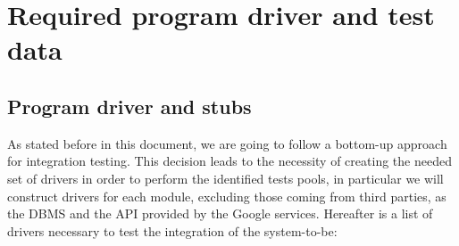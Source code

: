 \documentclass[10pt, a4paper,titlepage]{article}
\begin{document}
\section{Required program driver and test data}
\subsection{Program driver and stubs}
As stated before in this document, we are going to follow a bottom-up approach for integration testing. This decision leads to the necessity of creating the needed set of drivers in order to perform the identified tests pools, in particular we will construct drivers for each module, excluding those coming from third parties, as the DBMS and the API provided by the Google services. Hereafter is a list of drivers necessary to test the integration of the system-to-be:
\end{document}
